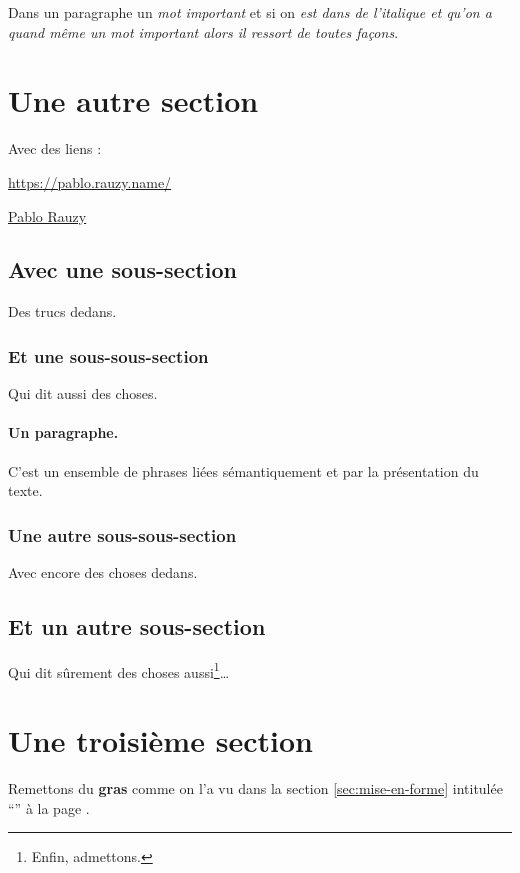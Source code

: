 \documentclass{article}
\begin{document}
Dans un paragraphe un \emph{mot important} et si on
\textit{est dans de l'italique et qu'on a quand même un
\emph{mot important} alors il ressort de toutes façons}.

\section{Une autre section}

Avec des liens :

\url{https://pablo.rauzy.name/}

\href{https://pablo.rauzy.name/}{Pablo Rauzy}

\subsection{Avec une sous-section}

Des trucs dedans.

\subsubsection{Et une sous-sous-section}

Qui dit aussi des choses.

\paragraph{Un paragraphe.}
C'est un ensemble de phrases liées sémantiquement et par la présentation du texte.

\subsubsection{Une autre sous-sous-section}

Avec encore des choses dedans.

\subsection{Et un autre sous-section}

Qui dit sûrement des choses aussi\footnote{Enfin, admettons.}…

\section{Une troisième section}

Remettons du \textbf{gras} comme on l'a vu dans la section
\ref{sec:mise-en-forme} intitulée ``''
à la page \pageref{sec:mise-en-forme}.
\end{document}
